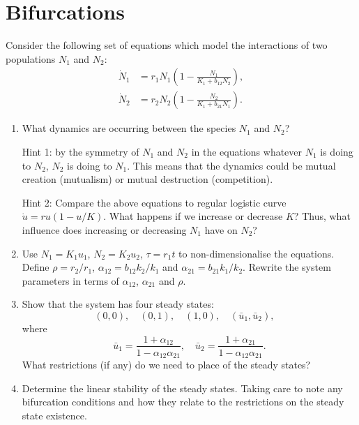 \documentclass[]{article}
\newcommand{\bb}{\begin{equation}}
\newcommand{\ee}{\end{equation}}
\renewcommand{\l}{\left(}
\renewcommand{\r}{\right)}
\begin{document}
\section{Bifurcations}
Consider the following set of equations which model the interactions of two populations $N_1$ and $N_2$:
\begin{align}
\dot{N}_1&=r_1N_1\l 1-\frac{N_1}{K_1+b_{12}N_2}\r,\\
\dot{N}_2&=r_2N_2\l 1-\frac{N_2}{K_1+b_{21}N_1}\r.
\end{align}
\begin{enumerate}
\item What dynamics are occurring between the species $N_1$ and $N_2$?

Hint 1: by the symmetry of $N_1$ and $N_2$ in the equations whatever $N_1$ is doing to $N_2$, $N_2$ is doing to $N_1$. This means that the dynamics could be mutual creation (mutualism) or mutual destruction (competition).

Hint 2: Compare the above equations to regular logistic curve $\dot{u}=ru(1-u/K)$. What happens if we increase or decrease $K$? Thus, what influence does increasing or decreasing $N_1$ have on $N_2$?

\item Use $N_1=K_1u_1$, $N_2=K_2u_2$, $\tau=r_1t$ to non-dimensionalise the equations. Define $\rho=r_2/r_1$, $\alpha_{12}=b_{12}k_2/k_1$ and $\alpha_{21}=b_{21}k_1/k_2$. Rewrite the system parameters in terms of $\alpha_{12}$, $\alpha_{21}$ and $\rho$.

\item Show that the system has four steady states:
\bb
(0,0), \quad (0,1), \quad (1,0), \quad (\bar{u}_1,\bar{u}_2), \quad
\ee
where
\bb
\bar{u}_1=\frac{1+\alpha_{12}}{1-\alpha_{12}\alpha_{21}},\quad\bar{u}_2=\frac{1+\alpha_{21}}{1-\alpha_{12}\alpha_{21}}.
\ee
What restrictions (if any) do we need to place of the steady states?
\item Determine the linear stability of the steady states. Taking care to note any bifurcation conditions and how they relate to the restrictions on the steady state existence.
\end{enumerate}
\end{document}
